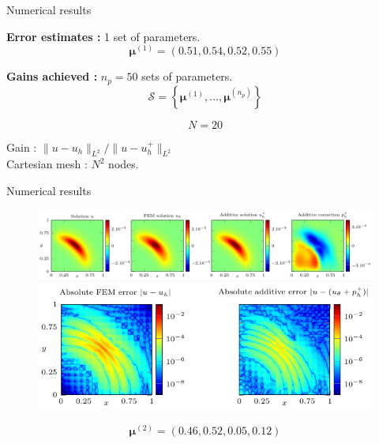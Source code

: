 \begin{frame}[noframenumbering]{Numerical results}
	\hspace{-5pt}\begin{minipage}[t]{0.46\linewidth}
		\textbf{Error estimates :} 1 set of parameters.
		$$\bm{\mu}^{(1)}=(0.51,0.54,0.52,0.55)$$
		\vspace{-35pt}
		\begin{figure}[H]
		\end{figure}
	\end{minipage} \qquad \small
	\begin{minipage}[t]{0.48\linewidth}
		\textbf{Gains achieved :} $n_p=50$ sets of parameters.
		$$\mathcal{S}=\left\{\bm{\mu}^{(1)},\dots,\bm{\mu}^{(n_p)}\right\}$$
		\vspace{-15pt}
		\begin{table}[H]
		\end{table}

		\normalsize\centering\vspace{-20pt}
		$$N=20$$

		\vspace{-5pt}
		Gain : $\| u-u_h\|_{L^2} / \| u-u_h^+\|_{L^2}$ \\
		
		\small\vspace{8pt}
		Cartesian mesh : $N^2$ nodes.
	\end{minipage}
\end{frame}

\begin{frame}{Numerical results}
	\begin{figure}[!ht] \centering
		\includegraphics[width=\linewidth]{images/numeric/elliptic/plots/standalone_solutions.pdf}
		
		\vspace{8pt}
		\includegraphics[width=0.7\linewidth]{images/numeric/elliptic/plots/standalone_errors.pdf}
	\end{figure}

	\vspace{-8pt}
	$$\bm{\mu}^{(2)}=(0.46,0.52,0.05,0.12)$$
\end{frame}

